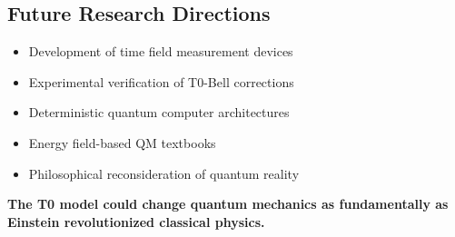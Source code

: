 \documentclass[12pt,a4paper]{article}
\begin{document}
	\subsection{Future Research Directions}
	
	\begin{itemize}
		\item Development of time field measurement devices
		\item Experimental verification of T0-Bell corrections
		\item Deterministic quantum computer architectures
		\item Energy field-based QM textbooks
		\item Philosophical reconsideration of quantum reality
	\end{itemize}
	
	\textbf{The T0 model could change quantum mechanics as fundamentally as Einstein revolutionized classical physics.}
	
\end{document}
